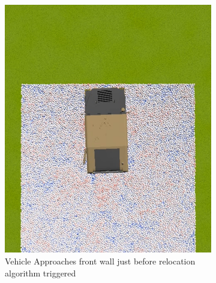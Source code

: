 \documentclass[12pt,onecolumn]{report}
\begin{document}
\begin{figure}
	\centering
	\begin{subfigure}[b]{0.49\columnwidth}
		\centering
		\includegraphics[width=\textwidth]{Figs/toRelocate.png}
		\caption{{\small Vehicle Approaches front wall just before relocation algorithm triggered}}   
		\label{fig:pre_relocate}
	\end{subfigure}
	\hfill
	\begin{subfigure}[b]{0.49\columnwidth}
		\centering

\end{subfigure}
\end{figure}
\end{document}
